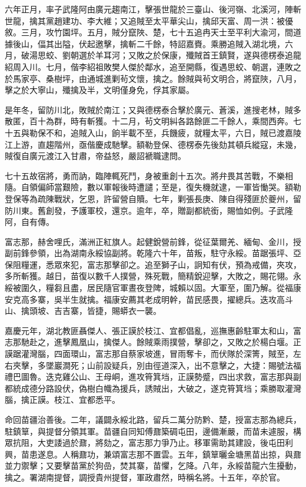 \begin{pinyinscope}
六年正月，率子武隆阿由廣元趨南江，擊張世龍於三臺山、後河嶺、北溪河，陣斬世龍，擒其黨趙建功、李大維；又追賊至太平華尖山，擒邱天富、周一洪：被優敘。三月，攻竹園坪。五月，賊分竄陜、楚，七十五追冉天士至平利大渝河，間道據後山，偪其出隘，伏起邀擊，擒斬二千餘，特詔嘉賚。乘勝追賊入湖北境，六月，破湯思蛟、劉朝選於羊耳河；又敗之於保康，殲賊首王鎮賢，遂與德楞泰追龍紹周入川。七月，偕李紹祖敗樊人傑於鄰水，追至開縣，復遇思蛟、朝選，連敗之於馬家亭、桑樹坪，由通城進剿茍文懷，擒之。餘賊與茍文明合，將竄陜，八月，擊之於大寧山，殲擒及半，文明僅身免，俘其家屬。

是年冬，留防川北，敗賊於南江；又與德楞泰合擊於廣元、蒼溪，進搜老林，賊多散匿，百十為群，時有斬獲。十二月，茍文明糾各路餘匪二千餘人，乘間西奔。七十五與勒保不和，追賊入山，餉半載不至，兵饑疲，就糧太平，六日，賊已渡嘉陵江上游，直趨階州，亟偕慶成馳擊。額勒登保、德楞泰先後劾其頓兵縱寇，未幾，賊復自廣元渡江入甘肅，帝益怒，嚴詔褫職逮問。

七十五故宿將，勇而訥，臨陣輒死鬥，身被重創十五次。將弁畏其苦戰，不樂相隨。自領偏師當艱險，數以軍報後時遭譴；至是，復失機就逮，一軍皆慟哭。額勒登保等為疏陳戰狀，乞恩，許留營自贖。七年，剿張長庚、陳自得殘匪於夔州，留防川東。舊創發，予護軍校，還京。逾年，卒，贈副都統銜，賜恤如例。子武隆阿，自有傳。

富志那，赫舍哩氏，滿洲正紅旗人。起健銳營前鋒，從征葉爾羌、緬甸、金川，授副前鋒參領，出為湖南永綏協副將。乾隆六十年，苗叛，駐守永綏。苗踞張坪、亞保阻糧運，悉眾來犯，富志那擊卻之。追至獅子山，詗知有伏，預為戒備，夾攻，多所斬獲。越日，苗復以數千人撲營，殊死戰，簡精銳迎擊，大敗之，賜花翎。永綏被圍久，糧芻且盡，居民隨官軍晝夜登陴，城賴以固。大軍至，圍乃解。從福康安克高多寨，吳半生就擒。福康安薦其老成明幹，苗民感畏，擢總兵。迭攻高斗山、擒頭坡、吉吉寨，皆捷，賜蟒衣一襲。

嘉慶元年，湖北教匪聶傑人、張正謨於枝江、宜都倡亂，巡撫惠齡駐軍太和山，富志那馳赴之，進擊鳳凰山，擒傑人。餘賊乘雨撲營，擊卻之，又敗之於楊白堰。正謨踞灌灣腦，四面環山，富志那自蔡家坡進，冒雨奪卡，而伏隊於深箐，賊至，左右夾擊，多墜巖澗死；山前設疑兵，別由徑道深入，出不意擊之，大捷：賜號法福禮巴圖魯。迭克雞公山、王母峒，進攻筲箕垱，正謨勢蹙，四出求救，富志那與副都統成德分路設伏，偽樹白幟為援兵，誘賊出，大破之，遂克筲箕垱；乘勝取灌灣腦，擒正謨。枝江、宜都悉平。

命回苗疆治善後。二年，議闢永綏北路，留兵二萬分防黔、楚，授富志那為總兵，駐鎮筸，與提督分領其軍。苗疆自同知傅鼐築碉屯田，邊備漸嚴，而苗未遽服，構眾抗阻，大吏諉過於鼐，將劾之，富志那力爭乃止。移軍需助其建設，後屯田利興，苗患遂息。人稱鼐功，兼頌富志那不置雲。五年，鎮筸曬金塘黑苗出掠，與鼐並力禦擊；又要擊苗黨於狗嵒，焚其寨，苗懼，乞降。八年，永綏苗龍六生擾動，擒之。署湖南提督，調授貴州提督，軍政肅然，時稱名將。十五年，卒於官。


\end{pinyinscope}
